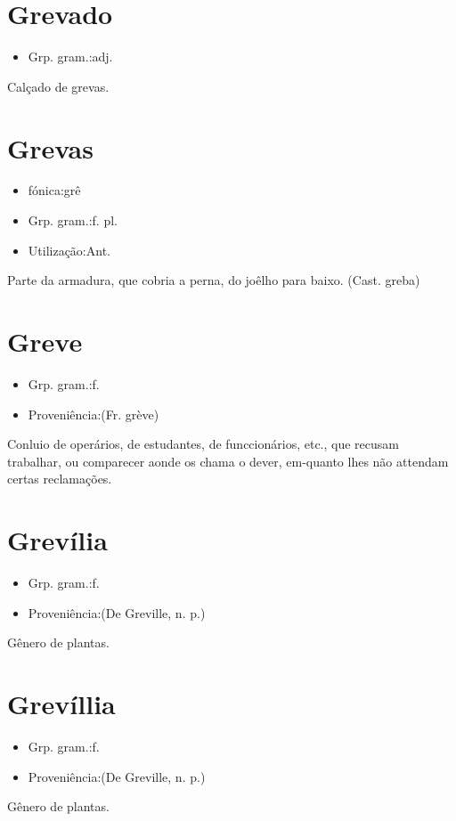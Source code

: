 \section{Grevado}
\begin{itemize}
\item {Grp. gram.:adj.}
\end{itemize}
Calçado de grevas.
\section{Grevas}
\begin{itemize}
\item {fónica:grê}
\end{itemize}
\begin{itemize}
\item {Grp. gram.:f. pl.}
\end{itemize}
\begin{itemize}
\item {Utilização:Ant.}
\end{itemize}
Parte da armadura, que cobria a perna, do joêlho para baixo.
(Cast. \textunderscore greba\textunderscore )
\section{Greve}
\begin{itemize}
\item {Grp. gram.:f.}
\end{itemize}
\begin{itemize}
\item {Proveniência:(Fr. \textunderscore grève\textunderscore )}
\end{itemize}
Conluio de operários, de estudantes, de funccionários, etc., que recusam trabalhar, ou comparecer aonde os chama o dever, em-quanto lhes não attendam certas reclamações.
\section{Grevília}
\begin{itemize}
\item {Grp. gram.:f.}
\end{itemize}
\begin{itemize}
\item {Proveniência:(De \textunderscore Greville\textunderscore , n. p.)}
\end{itemize}
Gênero de plantas.
\section{Grevíllia}
\begin{itemize}
\item {Grp. gram.:f.}
\end{itemize}
\begin{itemize}
\item {Proveniência:(De \textunderscore Greville\textunderscore , n. p.)}
\end{itemize}
Gênero de plantas.
